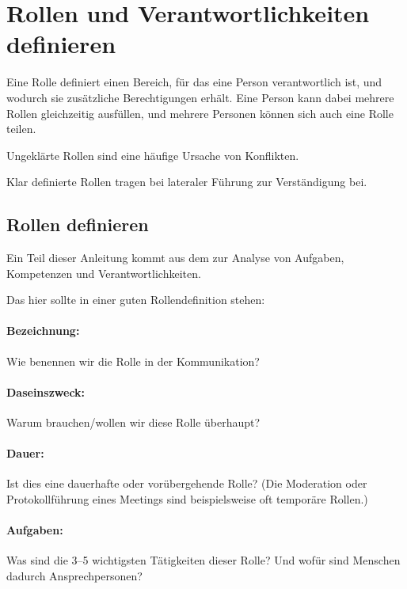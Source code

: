 \section{Rollen und Verantwortlichkeiten definieren}
\label{rollen}

Eine Rolle definiert einen Bereich, für das eine Person verantwortlich ist, und wodurch sie zusätzliche Berechtigungen erhält. Eine Person kann dabei mehrere Rollen gleichzeitig ausfüllen, und mehrere Personen können sich auch eine Rolle teilen.

Ungeklärte Rollen sind eine häufige Ursache von Konflikten.

Klar definierte Rollen tragen bei lateraler Führung zur Verständigung bei.


\subsection{Rollen definieren}

Ein Teil dieser Anleitung kommt aus dem  zur Analyse von Aufgaben, Kompetenzen und Verantwortlichkeiten.~\cite{kessler-projektmanagement}

Das hier sollte in einer guten Rollendefinition stehen:

\paragraph{Bezeichnung:} Wie benennen wir die Rolle in der Kommunikation?

\paragraph{Daseinszweck:} Warum brauchen/wollen wir diese Rolle überhaupt?

\paragraph{Dauer:} Ist dies eine dauerhafte oder vorübergehende Rolle? (Die Moderation oder Protokollführung eines Meetings sind beispielsweise oft temporäre Rollen.)

\paragraph{Aufgaben:} Was sind die 3--5 wichtigsten Tätigkeiten dieser Rolle? Und wofür sind Menschen dadurch Ansprechpersonen?

